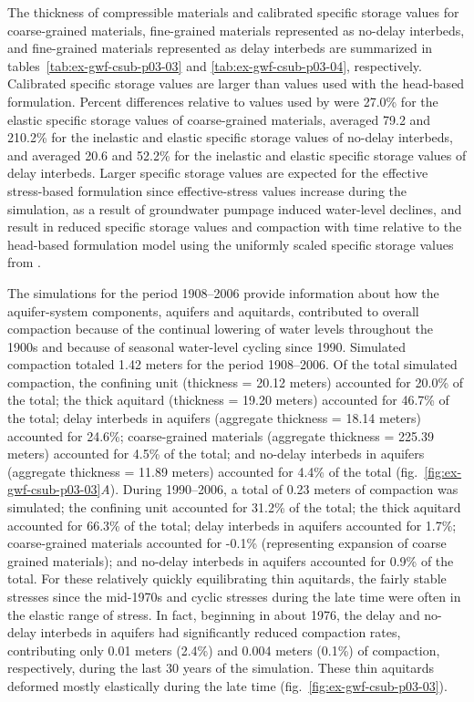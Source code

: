 The thickness of compressible materials and calibrated specific storage values for coarse-grained materials, fine-grained materials represented as no-delay interbeds, and fine-grained materials represented as delay interbeds are summarized in tables~\ref{tab:ex-gwf-csub-p03-03} and \ref{tab:ex-gwf-csub-p03-04}, respectively. Calibrated specific storage values are larger than values used with the head-based formulation. Percent differences relative to values used by \cite{sneed2008} were 27.0\% for the elastic specific storage values of coarse-grained materials, averaged 79.2 and 210.2\% for the inelastic and elastic specific storage values of no-delay interbeds, and averaged 20.6 and 52.2\% for the inelastic and elastic specific storage values of delay interbeds. Larger specific storage values are expected for the effective stress-based formulation since effective-stress values increase during the simulation, as a result of groundwater pumpage induced water-level declines, and result in reduced specific storage values and compaction with time relative to the head-based formulation model using the uniformly scaled specific storage values from \cite{sneed2008}.

 

 

The simulations for the period 1908--2006 provide information about how the aquifer-system components, aquifers and aquitards, contributed to overall compaction because of the continual lowering of water levels throughout the 1900s and because of seasonal water-level cycling since 1990. Simulated compaction totaled 1.42 meters for the period 1908--2006. Of the total simulated compaction, the confining unit (thickness = 20.12 meters) accounted for 20.0\% of the total; the thick aquitard (thickness = 19.20 meters) accounted for 46.7\% of the total; delay interbeds in aquifers (aggregate thickness = 18.14 meters) accounted for 24.6\%; coarse-grained materials (aggregate thickness = 225.39 meters) accounted for 4.5\% of the total; and no-delay interbeds in aquifers (aggregate thickness = 11.89 meters) accounted for 4.4\% of the total (fig.~\ref{fig:ex-gwf-csub-p03-03}\textit{A}). During 1990--2006, a total of 0.23 meters of compaction was simulated; the confining unit accounted for 31.2\% of the total; the thick aquitard accounted for 66.3\% of the total; delay interbeds in aquifers accounted for 1.7\%; coarse-grained materials accounted for -0.1\% (representing expansion of coarse grained materials); and no-delay interbeds in aquifers accounted for 0.9\% of the total. For these relatively quickly equilibrating thin aquitards, the fairly stable stresses since the mid-1970s and cyclic stresses during the late time were often in the elastic range of stress. In fact, beginning in about 1976, the delay and no-delay interbeds in aquifers had significantly reduced compaction rates, contributing only 0.01 meters (2.4\%) and 0.004 meters (0.1\%) of compaction, respectively, during the last 30 years of the simulation. These thin aquitards deformed mostly elastically during the late time (fig.~\ref{fig:ex-gwf-csub-p03-03}).

